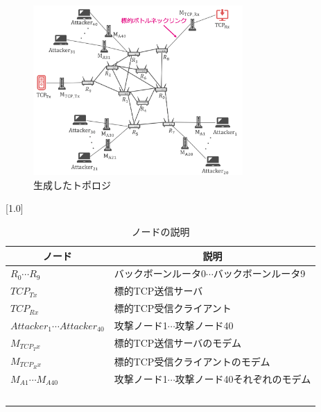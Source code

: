 \documentclass[Japanese]{dicomopapers}
\begin{document}
\begin{figure}[tb]
    \begin{center}
        \includegraphics[clip,width=8.0cm]{images/generated-topology-big.png}
        \caption{生成したトポロジ}
        \label{fig:generated-topology}
    \end{center}
\end{figure}

\begin{table}[tb]
    \caption{ノードの説明}
    \label{tab:node-description}
    \begin{center}
        \scalebox{0.80}[1.0]{
            \begin{tabular}{ll}
                \hline
                \multicolumn{1}{c}{ノード}             & \multicolumn{1}{c}{説明}        \\ \hline
                $R_{0} \cdots R_{9}$                & バックボーンルータ0$\cdots$バックボーンルータ9  \\
                $TCP_{Tx}$                          & 標的TCP送信サーバ                    \\
                $TCP_{Rx}$                          & 標的TCP受信クライアント                 \\
                $Attacker_{1} \cdots Attacker_{40}$ & 攻撃ノード1$\cdots$攻撃ノード40         \\
                $M_{TCP_Tx}$                        & 標的TCP送信サーバのモデム                \\
                $M_{TCP_Rx}$                        & 標的TCP受信クライアントのモデム             \\
                $M_{A1} \cdots M_{A40}$             & 攻撃ノード1$\cdots$攻撃ノード40それぞれのモデム \\　\\ \hline
            \end{tabular}
        }
    \end{center}
\end{table}
\end{document}

